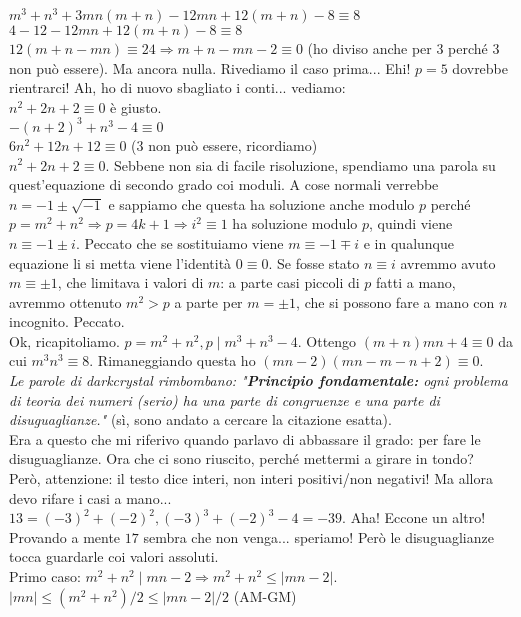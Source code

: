 \begin{sol}
  $m^3+n^3+3mn(m+n)-12mn+12(m+n)-8 \equiv 8$ \\
  $4-12-12mn+12(m+n)-8 \equiv 8$ \\
  $12(m+n-mn) \equiv 24 \Rightarrow m+n-mn-2 \equiv 0$ (ho diviso anche per 3 perché 3 non può essere). Ma ancora nulla. Rivediamo il caso prima... Ehi! $p=5$ dovrebbe rientrarci! Ah, ho di nuovo sbagliato i conti... vediamo: \\
  $n^2+2n+2 \equiv 0$ è giusto. \\
  $-(n+2)^3+n^3-4 \equiv 0$ \\
  $6n^2+12n+12 \equiv 0$ (3 non può essere, ricordiamo) \\
  $n^2+2n+2 \equiv 0$. Sebbene non sia di facile risoluzione, spendiamo una parola su quest'equazione di secondo grado coi moduli. A cose normali verrebbe $n=-1 \pm \sqrt{-1}$ e sappiamo che questa ha soluzione anche modulo $p$ perché $p=m^2+n^2 \Rightarrow p=4k+1 \Rightarrow i^2 \equiv 1$ ha soluzione modulo $p$, quindi viene $n \equiv -1 \pm i$. Peccato che se sostituiamo viene $m \equiv -1 \mp i$ e in qualunque equazione li si metta viene l'identità $0 \equiv 0$. Se fosse stato $n \equiv i$ avremmo avuto $m \equiv \pm 1$, che limitava i valori di $m$: a parte casi piccoli di $p$ fatti a mano, avremmo ottenuto $m^2>p$ a parte per $m= \pm 1$, che si possono fare a mano con $n$ incognito. Peccato. \\
  Ok, ricapitoliamo. $p=m^2+n^2, p \mid m^3+n^3-4$. Ottengo $(m+n)mn+4 \equiv 0$ da cui $m^3n^3 \equiv 8$. Rimaneggiando questa ho $(mn-2)(mn-m-n+2) \equiv 0$. \\
  \textit{Le parole di darkcrystal rimbombano: "\textbf{Principio fondamentale:} ogni problema di teoria dei numeri (serio) ha una parte di congruenze e una parte di disuguaglianze."} (sì, sono andato a cercare la citazione esatta). \\
  Era a questo che mi riferivo quando parlavo di abbassare il grado: per fare le disuguaglianze. Ora che ci sono riuscito, perché mettermi a girare in tondo? \\
  Però, attenzione: il testo dice interi, non interi positivi/non negativi! Ma allora devo rifare i casi a mano... \\
  $13=(-3)^2+(-2)^2, (-3)^3+(-2)^3-4=-39$. Aha! Eccone un altro! Provando a mente $17$ sembra che non venga... speriamo! Però le disuguaglianze tocca guardarle coi valori assoluti. \\
  Primo caso: $m^2+n^2 \mid mn-2 \Rightarrow m^2+n^2 \le |mn-2|$. \\
  $|mn| \le (m^2+n^2)/2 \le |mn-2|/2$ (AM-GM) \\

\end{sol}
